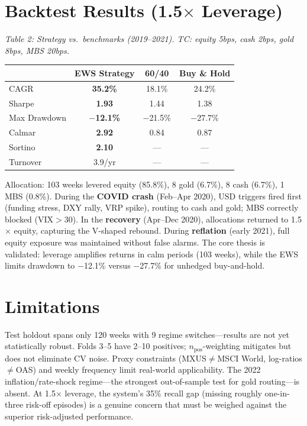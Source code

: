 \documentclass[10pt, a4paper]{article}
\begin{document}
\section{Backtest Results (1.5$\times$ Leverage)}

\vspace{2pt}
\begin{center}
\small
\textit{Table 2: Strategy vs.\ benchmarks (2019--2021). TC: equity 5bps, cash 2bps, gold 8bps, MBS 20bps.}\\[4pt]
\begin{tabular}{lccc}
\toprule
& \textbf{EWS Strategy} & \textbf{60/40} & \textbf{Buy \& Hold}\\
\midrule
CAGR & \textbf{35.2\%} & 18.1\% & 24.2\%\\
Sharpe & \textbf{1.93} & 1.44 & 1.38\\
Max Drawdown & \textbf{$-$12.1\%} & $-$21.5\% & $-$27.7\%\\
Calmar & \textbf{2.92} & 0.84 & 0.87\\
Sortino & \textbf{2.10} & --- & ---\\
Turnover & 3.9/yr & --- & ---\\
\bottomrule
\end{tabular}
\end{center}
\vspace{2pt}

Allocation: 103 weeks levered equity (85.8\%), 8 gold (6.7\%), 8 cash (6.7\%), 1 MBS (0.8\%). During the \textbf{COVID crash} (Feb--Apr 2020), USD triggers fired first (funding stress, DXY rally, VRP spike), routing to cash and gold; MBS correctly blocked (VIX$>$30). In the \textbf{recovery} (Apr--Dec 2020), allocations returned to 1.5$\times$ equity, capturing the V-shaped rebound. During \textbf{reflation} (early 2021), full equity exposure was maintained without false alarms. The core thesis is validated: leverage amplifies returns in calm periods (103 weeks), while the EWS limits drawdown to $-$12.1\% versus $-$27.7\% for unhedged buy-and-hold.

\section{Limitations}

Test holdout spans only 120 weeks with 9 regime switches---results are not yet statistically robust. Folds 3--5 have 2--10 positives; $n_{\text{pos}}$-weighting mitigates but does not eliminate CV noise. Proxy constraints (MXUS$\neq$MSCI World, log-ratios$\neq$OAS) and weekly frequency limit real-world applicability. The 2022 inflation/rate-shock regime---the strongest out-of-sample test for gold routing---is absent. At 1.5$\times$ leverage, the system's 35\% recall gap (missing roughly one-in-three risk-off episodes) is a genuine concern that must be weighed against the superior risk-adjusted performance.
\end{document}
